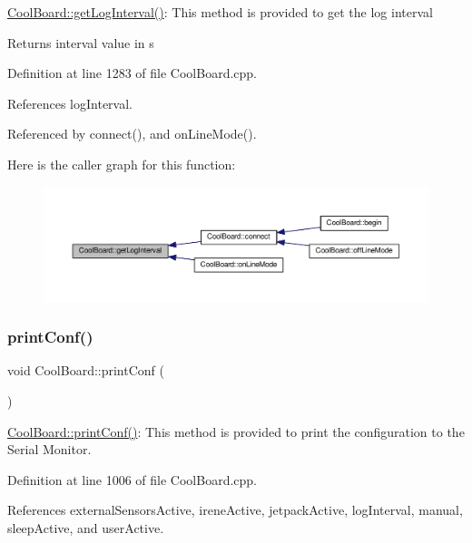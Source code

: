 \hyperlink{class_cool_board_a7508e029f2ee17bb747ffab599285e0d}{Cool\+Board\+::get\+Log\+Interval()}\+: This method is provided to get the log interval

\begin{DoxyReturn}{Returns}
interval value in s 
\end{DoxyReturn}


Definition at line 1283 of file Cool\+Board.\+cpp.



References log\+Interval.



Referenced by connect(), and on\+Line\+Mode().

Here is the caller graph for this function\+:
\nopagebreak
\begin{figure}[H]
\begin{center}
\leavevmode
\includegraphics[width=350pt]{d7/df9/class_cool_board_a7508e029f2ee17bb747ffab599285e0d_icgraph}
\end{center}
\end{figure}
\mbox{\label{class_cool_board_a486507b8f0981d3cc671ed31c2145755}} 
\subsubsection{\texorpdfstring{print\+Conf()}{printConf()}}
{\footnotesize\ttfamily void Cool\+Board\+::print\+Conf (\begin{DoxyParamCaption}{ }\end{DoxyParamCaption})}

\hyperlink{class_cool_board_a486507b8f0981d3cc671ed31c2145755}{Cool\+Board\+::print\+Conf()}\+: This method is provided to print the configuration to the Serial Monitor. 

Definition at line 1006 of file Cool\+Board.\+cpp.



References external\+Sensors\+Active, irene\+Active, jetpack\+Active, log\+Interval, manual, sleep\+Active, and user\+Active.

